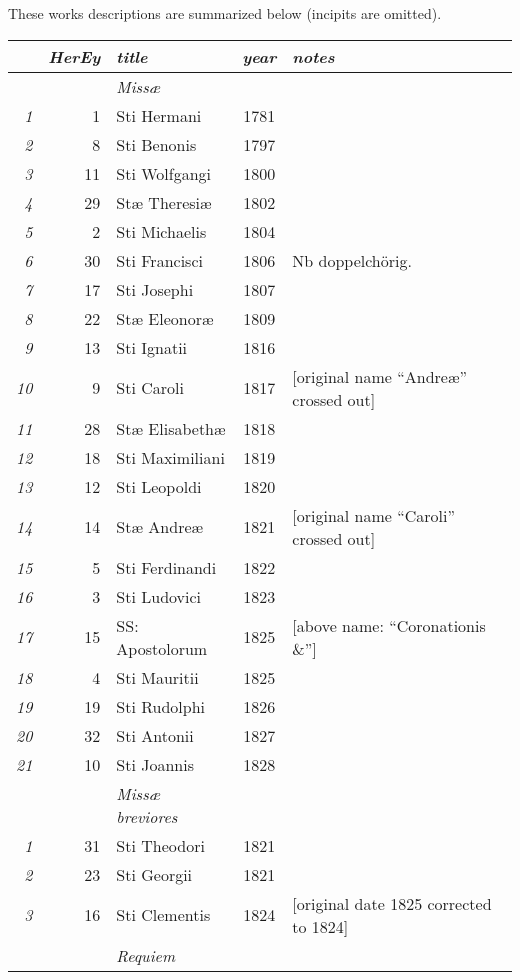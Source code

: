 \documentclass{ees}
\begin{document}
These works descriptions are summarized below (incipits are omitted).{\footnotesize
\begin{xltabular}{\linewidth}{>{\itshape}rrlc X}
  \toprule
  & \itshape HerEy & \itshape title & \itshape year & \itshape notes \\
  \midrule \endhead
  & & \itshape Missæ \\
  \cmidrule(lr){3-3}
  1  &   1 & Sti Hermani & 1781 &  \\
  2  &   8 & Sti Benonis & 1797 &  \\
  3  &  11 & Sti Wolfgangi & 1800 &  \\
  4  &  29 & Stæ Theresiæ & 1802 &  \\
  5  &   2 & Sti Michaelis & 1804 &  \\
  6  &  30 & Sti Francisci & 1806 & Nb doppelchörig. \\
  7  &  17 & Sti Josephi & 1807 &  \\
  8  &  22 & Stæ Eleonoræ & 1809 &  \\
  9  &  13 & Sti Ignatii & 1816 &  \\
  10 &   9 & Sti Caroli & 1817 & [original name “Andreæ” crossed out] \\
  11 &  28 & Stæ Elisabethæ & 1818 &  \\
  12 &  18 & Sti Maximiliani & 1819 &  \\
  13 &  12 & Sti Leopoldi & 1820 &  \\
  14 &  14 & Stæ Andreæ & 1821 & [original name “Caroli” crossed out] \\
  15 &   5 & Sti Ferdinandi & 1822 &  \\
  16 &   3 & Sti Ludovici & 1823 &  \\
  17 &  15 & SS: Apostolorum & 1825 & [above name: “Coronationis \&”] \\
  18 &   4 & Sti Mauritii & 1825 &  \\
  19 &  19 & Sti Rudolphi & 1826 &  \\
  20 &  32 & Sti Antonii & 1827 &  \\
  21 &  10 & Sti Joannis & 1828 &  \\
  \midrule
  & & \itshape Missæ breviores \\
  \cmidrule(lr){3-3}
  1 & 31 & Sti Theodori & 1821 & \\
  2 & 23 & Sti Georgii & 1821 & \\
  3 & 16 & Sti Clementis & 1824 & [original date 1825 corrected to 1824] \\
  \midrule
  & & \itshape Requiem \\

\end{xltabular}}
\end{document}
